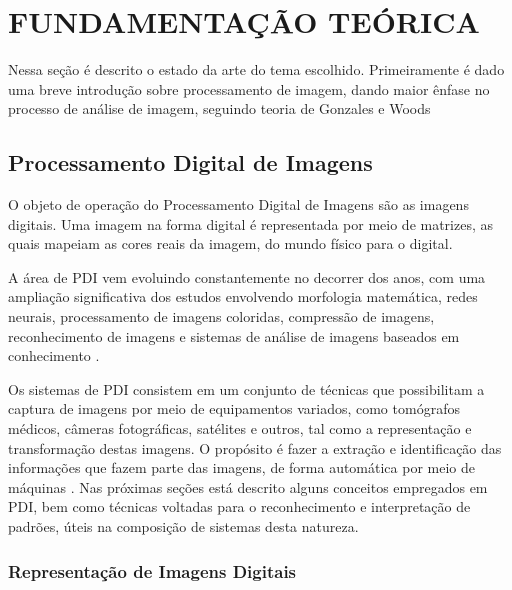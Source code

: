\chapter{FUNDAMENTAÇÃO TEÓRICA} \label{cap:funda}

Nessa seção é descrito o estado da arte do tema escolhido. Primeiramente é dado uma breve introdução sobre processamento de imagem, dando maior ênfase no processo de análise de imagem, seguindo teoria de Gonzales e Woods %

\section{Processamento Digital de Imagens}

O objeto de operação do Processamento Digital de Imagens são as imagens digitais\cite{Almeida2018}. Uma imagem na forma digital é representada por meio de matrizes, as quais mapeiam as cores reais da imagem, do mundo físico para o digital.



A área de PDI vem evoluindo constantemente no decorrer dos anos, com uma ampliação significativa dos estudos envolvendo morfologia matemática, redes neurais, processamento de imagens coloridas, compressão de imagens, reconhecimento de imagens e sistemas de análise de imagens baseados em conhecimento \cite{GONZALEZ2002}. 

Os sistemas de PDI consistem em um conjunto de técnicas que possibilitam a captura de imagens por meio de equipamentos variados, como tomógrafos médicos, câmeras fotográficas, satélites e outros, tal como a representação e transformação destas imagens. O propósito é fazer a extração e identificação das informações que fazem parte das imagens, de forma automática por meio de máquinas \cite{PEDRINI2008}. Nas próximas seções está descrito alguns conceitos empregados em PDI, bem como técnicas voltadas para o reconhecimento e interpretação de padrões, úteis na composição de sistemas desta natureza. 



\subsection{Representação de Imagens Digitais}

